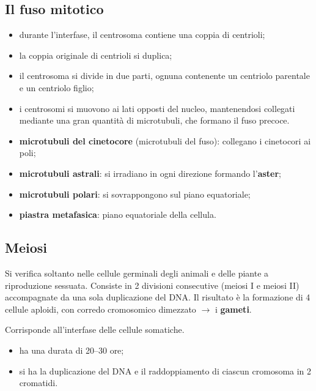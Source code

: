 \subsection{Il fuso mitotico}

\begin{itemize}
  \item durante l'interfase, il centrosoma contiene una coppia di centrioli;
  \item la coppia originale di centrioli si duplica;
  \item il centrosoma si divide in due parti, ognuna contenente un centriolo parentale e un centriolo figlio;
  \item i centrosomi si muovono ai lati opposti del nucleo, mantenendosi collegati mediante una gran quantità di microtubuli, che formano il fuso precoce.
\end{itemize}

\begin{itemize}
  \item \textbf{microtubuli del cinetocore} (microtubuli del fuso): collegano i cinetocori ai poli;
  \item \textbf{microtubuli astrali}: si irradiano in ogni direzione formando l'\textbf{aster};
  \item \textbf{microtubuli polari}: si sovrappongono sul piano equatoriale;
  \item \textbf{piastra metafasica}: piano equatoriale della cellula.
\end{itemize}

\subsection{Meiosi}

Si verifica soltanto nelle cellule germinali degli animali e delle piante a riproduzione sessuata. Consiste in 2 divisioni consecutive (meiosi I e meiosi II) accompagnate da una sola duplicazione del DNA. Il risultato è la formazione di 4 cellule aploidi, con corredo cromosomico dimezzato $\rightarrow$ i \textbf{gameti}.

Corrisponde all'interfase delle cellule somatiche.
\begin{itemize}
  \item ha una durata di 20--30 ore;
  \item si ha la duplicazione del DNA e il raddoppiamento di ciascun cromosoma in 2 cromatidi.
\end{itemize}

